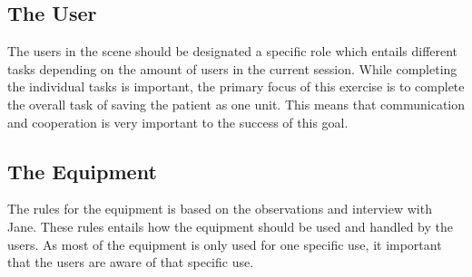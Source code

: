 \documentclass[paper=a4, fontsize=11pt]{scrartcl} %
\numberwithin{equation}{section} %
\numberwithin{figure}{section} %
\numberwithin{table}{section} %
\begin{document}
\subsection{The User}
The users in the scene should be designated a specific role which entails different tasks depending on the amount of users in the current session. While completing the individual tasks is important, the primary focus of this exercise is to complete the overall task of saving the patient as one unit. This means that communication and cooperation is very important to the success of this goal.

\subsection{The Equipment}
The rules for the equipment is based on the observations and interview with Jane. These rules entails how the equipment should be used and handled by the users. As most of the equipment is only used for one specific use, it important that the users are aware of that specific use.

\end{document}
